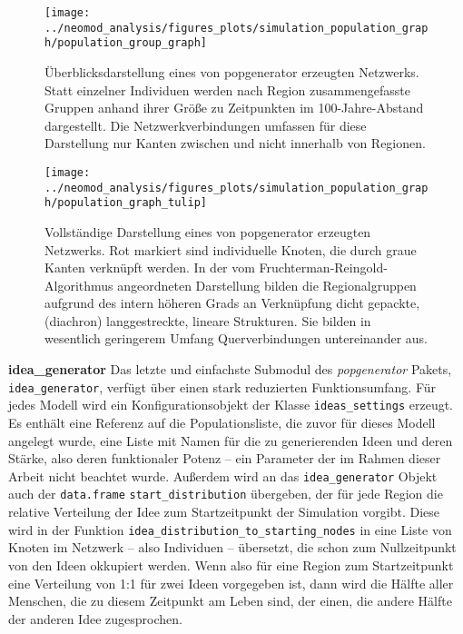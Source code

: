 \documentclass[openany,twoside,twocolumn]{book}
\begin{document}
\begin{landscape}
\begin{figure}[!t]

{\centering \texttt{[image: ../neomod\_analysis/figures\_plots/simulation\_population\_graph/population\_group\_graph]} 

}

\caption[Überblicksdarstellung eines von popgenerator erzeugten Netzwerks]{Überblicksdarstellung eines von popgenerator erzeugten Netzwerks. Statt einzelner Individuen werden nach Region zusammengefasste Gruppen anhand ihrer Größe zu Zeitpunkten im 100-Jahre-Abstand dargestellt. Die Netzwerkverbindungen umfassen für diese Darstellung nur Kanten zwischen und nicht innerhalb von Regionen.}\label{fig:group-graph}
\end{figure}
\end{landscape}

\begin{figure}
\texttt{[image: ../neomod\_analysis/figures\_plots/simulation\_population\_graph/population\_graph\_tulip]} \caption[Vollständige Darstellung eines von popgenerator erzeugten Netzwerks]{Vollständige Darstellung eines von popgenerator erzeugten Netzwerks. Rot markiert sind individuelle Knoten, die durch graue Kanten verknüpft werden. In der vom Fruchterman-Reingold-Algorithmus angeordneten Darstellung bilden die Regionalgruppen aufgrund des intern höheren Grads an Verknüpfung dicht gepackte, (diachron) langgestreckte, lineare Strukturen. Sie bilden in wesentlich geringerem Umfang Querverbindungen untereinander aus.}\label{fig:graph-tulip}
\end{figure}

\textbf{idea\_generator} \newline  Das letzte und einfachste Submodul
des \emph{popgenerator} Pakets, \texttt{idea\_generator}, verfügt über
einen stark reduzierten Funktionsumfang. Für jedes Modell wird ein
Konfigurationsobjekt der Klasse \texttt{ideas\_settings} erzeugt. Es
enthält eine Referenz auf die Populationsliste, die zuvor für dieses
Modell angelegt wurde, eine Liste mit Namen für die zu generierenden
Ideen und deren Stärke, also deren funktionaler Potenz -- ein Parameter
der im Rahmen dieser Arbeit nicht beachtet wurde. Außerdem wird an das
\texttt{idea\_generator} Objekt auch der \texttt{data.frame}
\texttt{start\_distribution} übergeben, der für jede Region die relative
Verteilung der Idee zum Startzeitpunkt der Simulation vorgibt. Diese
wird in der Funktion \texttt{idea\_distribution\_to\_starting\_nodes} in
eine Liste von Knoten im Netzwerk -- also Individuen -- übersetzt, die
schon zum Nullzeitpunkt von den Ideen okkupiert werden. Wenn also für
eine Region zum Startzeitpunkt eine Verteilung von 1:1 für zwei Ideen
vorgegeben ist, dann wird die Hälfte aller Menschen, die zu diesem
Zeitpunkt am Leben sind, der einen, die andere Hälfte der anderen Idee
zugesprochen.
\end{document}
